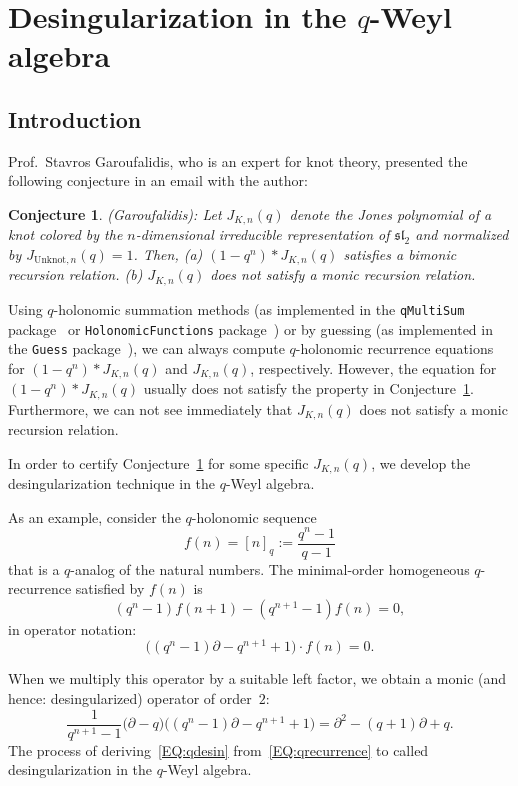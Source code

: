 \documentclass[10pt,a4paper]{article}
\newcommand{\pa}{ {\partial}}
\newtheorem{conj}[thm]{Conjecture}
\begin{document}
\section{Desingularization in the \texorpdfstring{$q$}{q}-Weyl algebra} \label{SECT:qdesing}

\subsection{Introduction}

Prof.\ Stavros Garoufalidis, who is an expert for knot theory, 
presented the following conjecture in an email with the author:

\begin{conj} \label{CONJ:stavros}
(Garoufalidis): Let $J_{K,n}(q)$ denote the Jones polynomial of a knot colored by the $n$-dimensional irreducible 
representation of $\mathfrak{sl}_2$ and normalized by $J_{\text{Unknot},n}(q)=1$. 
Then, (a) $(1-q^n)*J_{K,n}(q)$ satisfies a bimonic recursion relation. (b) $J_{K,n}(q)$ does not satisfy a monic recursion relation.
\end{conj}

Using $q$-holonomic summation methods (as implemented in the \texttt{qMultiSum}
package~\cite{Riese03} or \texttt{HolonomicFunctions}
package~\cite{Christoph2010}) or by guessing (as implemented in the
\texttt{Guess} package~\cite{Kauers2009a}), 
we can always compute $q$-holonomic recurrence equations for $(1-q^n)*J_{K,n}(q)$ and $J_{K,n}(q)$, respectively. 
However, the equation for $(1-q^n)*J_{K,n}(q)$ usually does not satisfy the property in Conjecture~\ref{CONJ:stavros}. 
Furthermore, we can not see immediately that $J_{K,n}(q)$ does not satisfy a monic recursion relation.

In order to certify Conjecture~\ref{CONJ:stavros} for some specific $J_{K,n}(q)$, 
we develop the desingularization technique in the $q$-Weyl algebra. 

As an example, consider the $q$-holonomic sequence
\[
  f(n) = [n]_q := \frac{q^n-1}{q-1}
\]
that is a $q$-analog of the natural numbers.  The minimal-order homogeneous
$q$-recurrence satisfied by $f(n)$ is
\[
  (q^n-1)f(n+1) - (q^{n+1}-1)f(n) = 0,
\]
in operator notation:
\begin{equation} \label{EQ:qrecurrence}
 \bigl((q^n-1)\pa - q^{n+1} + 1\bigr) \cdot f(n) = 0.
\end{equation}

When we multiply this operator by a suitable left factor, we obtain
a monic (and hence: desingularized) operator of order~$2$:
\begin{equation} \label{EQ:qdesin}
  \frac{1}{q^{n+1}-1}\bigl(\pa - q\bigr)\bigl((q^n-1)\pa - q^{n+1} + 1\bigr) =
  \pa^2 - (q+1)\pa + q.
\end{equation}
The process of deriving~\eqref{EQ:qdesin} from~\eqref{EQ:qrecurrence} to called desingularization in the $q$-Weyl algebra.
\end{document}
